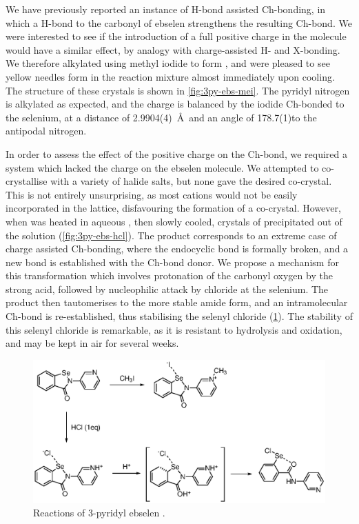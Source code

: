 We have previously reported an instance of H-bond assisted Ch-bonding, in which a H-bond to the carbonyl of ebselen strengthens the resulting Ch-bond.
We were interested to see if the introduction of a full positive charge in the molecule would have a similar effect, by analogy with charge-assisted H- and X-bonding.
We therefore alkylated  using methyl iodide to form , and were pleased to see yellow needles form in the reaction mixture almost immediately upon cooling.
The structure of these crystals is shown in \ref{fig:3py-ebs-mei}.
The pyridyl nitrogen is alkylated as expected, and the charge is balanced by the iodide Ch-bonded to the selenium, at a distance of 2.9904(4)~\AA~and an angle of 178.7(1)\degree to the antipodal nitrogen.

In order to assess the effect of the positive charge on the Ch-bond, we required a system which lacked the charge on the ebselen molecule.
We attempted to co-crystallise  with a variety of halide salts, but none gave the desired co-crystal.
This is not entirely unsurprising, as most cations would not be easily incorporated in the lattice, disfavouring the formation of a co-crystal.
However, when  was heated in aqueous , then slowly cooled, crystals of  precipitated out of the solution (\ref{fig:3py-ebs-hcl}).
The product  corresponds to an extreme case of charge assisted Ch-bonding, where the endocyclic  bond is formally broken, and a new bond is established with the Ch-bond donor.
We propose a mechanism for this transformation which involves protonation of the carbonyl oxygen by the strong acid, followed by nucleophilic attack by chloride at the selenium.
The product then tautomerises to the more stable amide form, and an intramolecular Ch-bond is re-established, thus stabilising the selenyl chloride (\ref{sch:selenylchloride-mechanism}).
The stability of this selenyl chloride is remarkable, as it is resistant to hydrolysis and oxidation, and may be kept in air for several weeks.

\begin{figure}
    \centering
    \includegraphics[scale=0.8]{Figures/scheme.eps}
    \caption{Reactions of 3-pyridyl ebselen .}
    \label{sch:selenylchloride-mechanism}
\end{figure}

